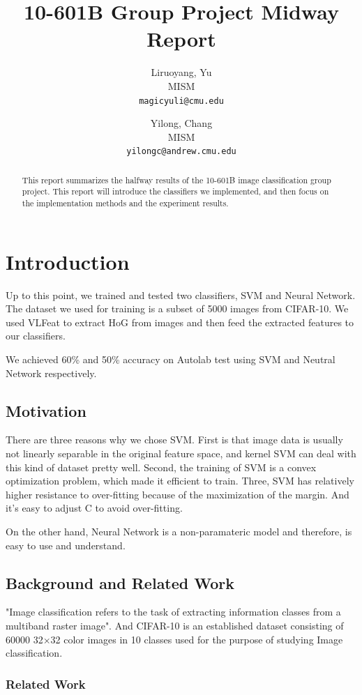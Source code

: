 \documentclass{article} %
\title{10-601B Group Project Midway Report}
\author{
Liruoyang, Yu\\
MISM\\
\texttt{magicyuli@cmu.edu}
\and
Yilong, Chang\\
MISM\\
\texttt{yilongc@andrew.cmu.edu}
}
\begin{document}
\maketitle
\begin{abstract}
This report summarizes the halfway results of the 10-601B image classification group project. This report will introduce the classifiers we implemented, and then focus on the implementation methods and the experiment results.
\end{abstract}

\section{Introduction}
Up to this point, we trained and tested two classifiers, SVM and Neural Network. The dataset we used for training is a subset of 5000 images from CIFAR-10. We used VLFeat to extract HoG from images and then feed the extracted features to our classifiers.

We achieved 60\% and 50\% accuracy on Autolab test using SVM and Neutral Network respectively.

\subsection{Motivation}

There are three reasons why we chose SVM. First is that image data is usually not linearly separable in the original feature space, and kernel SVM can deal with this kind of dataset pretty well. Second, the training of SVM is a convex optimization problem, which made it efficient to train. Three, SVM has relatively higher resistance to over-fitting because of the maximization of the margin. And it's easy to adjust C to avoid over-fitting.

On the other hand, Neural Network is a non-paramateric model and therefore, is easy to use and understand.

\subsection{Background and Related Work}

"Image classification refers to the task of extracting information classes from a multiband raster image". And CIFAR-10 is an established dataset consisting of 60000 32$\times$32 color images in 10 classes used for the purpose of studying Image classification. 

\subsubsection{Related Work}
\end{document}
